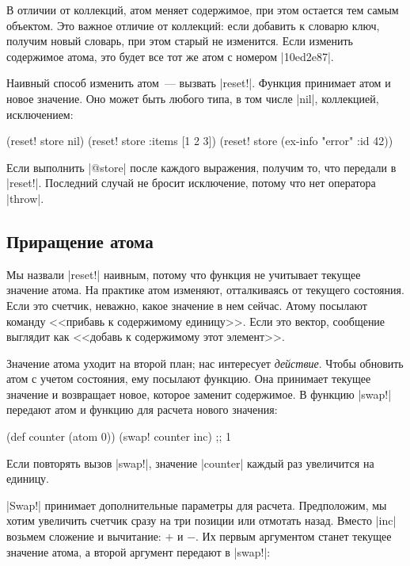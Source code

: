 В отличии от коллекций, атом меняет содержимое, при этом остается тем самым
объектом. Это важное отличие от коллекций: если добавить к словарю ключ, получим
новый словарь, при этом старый не изменится. Если изменить содержимое атома, это
будет все тот же атом с номером \spverb|10ed2e87|.

Наивный способ изменить атом~--- вызвать \spverb|reset!|. Функция принимает атом
и новое значение. Оно может быть любого типа, в том числе \spverb|nil|,
коллекцией, исключением:

\begin{english}
  \begin{clojure}
(reset! store nil)
(reset! store {:items [1 2 3]})
(reset! store (ex-info "error" {:id 42}))
  \end{clojure}
\end{english}

Если выполнить \spverb|@store| после каждого выражения, получим то, что передали
в \spverb|reset!|. Последний случай не бросит исключение, потому что нет
оператора \spverb|throw|.

\subsection{Приращение атома}

Мы назвали \spverb|reset!| наивным, потому что функция не учитывает текущее
значение атома. На практике атом изменяют, отталкиваясь от текущего состояния.
Если это счетчик, неважно, какое значение в нем сейчас. Атому посылают команду
<<прибавь к содержимому единицу>>. Если это вектор, сообщение выглядит как
<<добавь к содержимому этот элемент>>.

Значение атома уходит на второй план; нас интересует \emph{действие}. Чтобы
обновить атом с учетом состояния, ему посылают функцию. Она принимает текущее
значение и возвращает новое, которое заменит содержимое. В функцию
\spverb|swap!| передают атом и функцию для расчета нового значения:

\begin{english}
  \begin{clojure}
(def counter (atom 0))
(swap! counter inc) ;; 1
  \end{clojure}
\end{english}

Если повторять вызов \spverb|swap!|, значение \spverb|counter| каждый раз
увеличится на единицу.

\spverb|Swap!| принимает дополнительные параметры для расчета. Предположим, мы
хотим увеличить счетчик сразу на три позиции или отмотать назад. Вместо
\spverb|inc| возьмем сложение и вычитание: $+$ и $-$. Их первым аргументом
станет текущее значение атома, а второй аргумент передают в \spverb|swap!|:

